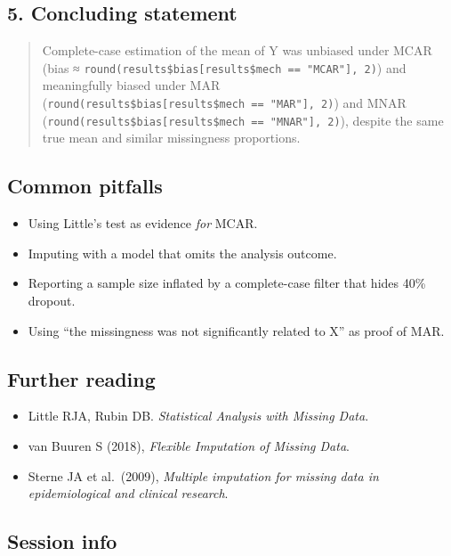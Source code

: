 \documentclass[
]{article}
\providecommand{\tightlist}{%
  \setlength{\itemsep}{0pt}\setlength{\parskip}{0pt}}
\begin{document}
\subsection{5. Concluding statement}\label{concluding-statement}

\begin{quote}
Complete-case estimation of the mean of Y was unbiased under MCAR (bias
≈ \texttt{round(results\$bias{[}results\$mech\ ==\ "MCAR"{]},\ 2)}) and
meaningfully biased under MAR
(\texttt{round(results\$bias{[}results\$mech\ ==\ "MAR"{]},\ 2)}) and
MNAR (\texttt{round(results\$bias{[}results\$mech\ ==\ "MNAR"{]},\ 2)}),
despite the same true mean and similar missingness proportions.
\end{quote}

\subsection{Common pitfalls}\label{common-pitfalls}

\begin{itemize}
\tightlist
\item
  Using Little's test as evidence \emph{for} MCAR.
\item
  Imputing with a model that omits the analysis outcome.
\item
  Reporting a sample size inflated by a complete-case filter that hides
  40\% dropout.
\item
  Using ``the missingness was not significantly related to X'' as proof
  of MAR.
\end{itemize}

\subsection{Further reading}\label{further-reading}

\begin{itemize}
\tightlist
\item
  Little RJA, Rubin DB. \emph{Statistical Analysis with Missing Data}.
\item
  van Buuren S (2018), \emph{Flexible Imputation of Missing Data}.
\item
  Sterne JA et al.~(2009), \emph{Multiple imputation for missing data in
  epidemiological and clinical research}.
\end{itemize}

\subsection{Session info}\label{session-info}
\end{document}
